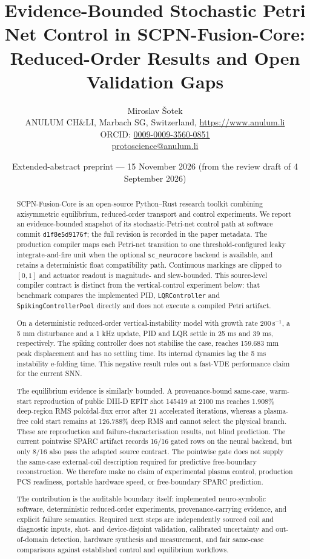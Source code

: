 \documentclass[11pt]{article}
\title{Evidence-Bounded Stochastic Petri Net Control in SCPN-Fusion-Core:\\
Reduced-Order Results and Open Validation Gaps}
\author{Miroslav \v{S}otek\\
\small ANULUM CH\&LI, Marbach SG, Switzerland, \url{https://www.anulum.li}\\
\small ORCID: \href{https://orcid.org/0009-0009-3560-0851}{0009-0009-3560-0851}\\
\small \href{mailto:protoscience@anulum.li}{protoscience@anulum.li}}
\date{Extended-abstract preprint --- 15 November 2026 (from the review draft of 4 September 2026)}
\begin{document}
\maketitle

\begin{abstract}
SCPN-Fusion-Core is an open-source Python--Rust research toolkit combining
axisymmetric equilibrium, reduced-order transport and control experiments.  We
report an evidence-bounded snapshot of its stochastic-Petri-net control path at
software commit \texttt{d1f8e5d9176f}; the full revision is recorded in the
paper metadata.  The production compiler maps each Petri-net transition to one
threshold-configured leaky integrate-and-fire unit when the optional
\texttt{sc\_neurocore} backend is available, and retains a deterministic float
compatibility path.  Continuous markings are clipped to $[0,1]$ and actuator
readout is magnitude- and slew-bounded.  This source-level compiler contract is
distinct from the vertical-control experiment below: that benchmark compares
the implemented PID, \texttt{LQRController} and \texttt{SpikingControllerPool}
directly and does not execute a compiled Petri artifact.

On a deterministic reduced-order vertical-instability model with growth rate
$200\,\mathrm{s}^{-1}$, a 5 mm disturbance and a 1 kHz update, PID and LQR settle
in 25 ms and 39 ms, respectively.  The spiking controller does not stabilise the
case, reaches 159.683 mm peak displacement and has no settling time.  Its
internal dynamics lag the 5 ms instability e-folding time.  This negative result
rules out a fast-VDE performance claim for the current SNN.

The equilibrium evidence is similarly bounded.  A provenance-bound same-case,
warm-start reproduction of public DIII-D EFIT shot 145419 at 2100 ms reaches
1.908\% deep-region RMS poloidal-flux error after 21 accelerated iterations,
whereas a plasma-free cold start remains at 126.788\% deep RMS and cannot select
the physical branch.  These are reproduction and failure-characterisation
results, not blind prediction.  The current pointwise SPARC artifact records
16/16 gated rows on the neural backend, but only 8/16 also pass the adapted
source contract.  The pointwise gate does not supply the same-case external-coil
description required for predictive free-boundary reconstruction.
We therefore make no claim of experimental plasma control, production PCS
readiness, portable hardware speed, or free-boundary SPARC prediction.

The contribution is the auditable boundary itself: implemented neuro-symbolic
software, deterministic reduced-order experiments, provenance-carrying evidence,
and explicit failure semantics.  Required next steps are independently sourced
coil and diagnostic inputs, shot- and device-disjoint validation, calibrated
uncertainty and out-of-domain detection, hardware synthesis and measurement,
and fair same-case comparisons against established control and equilibrium
workflows.
\end{abstract}
\end{document}
